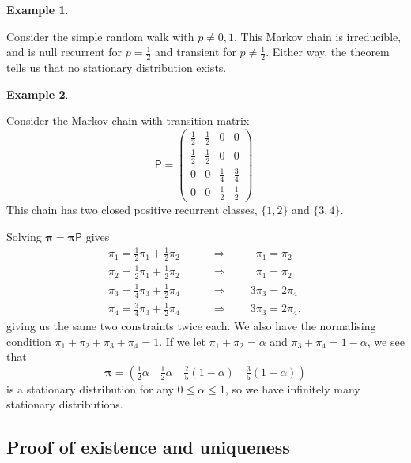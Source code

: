 \documentclass[
  a4paper,
]{article}
\theoremstyle{definition}
\theoremstyle{definition}
\newtheorem{example}{Example}[section]
\theoremstyle{definition}
\theoremstyle{remark}
\begin{document}
\begin{example}
\protect\hypertarget{exm:stat-rw}{}\label{exm:stat-rw}

Consider the simple random walk with \(p \neq 0,1\). This Markov chain is irreducible, and is null recurrent for \(p = \frac12\) and transient for \(p \neq \frac12\). Either way, the theorem tells us that no stationary distribution exists.

\end{example}

\begin{example}
\protect\hypertarget{exm:stat-two}{}\label{exm:stat-two}

Consider the Markov chain with transition matrix
\[ \mathsf P = \begin{pmatrix} \frac12 & \frac12 & 0 & 0 \\
\frac12 & \frac12 & 0 & 0 \\
0 & 0 & \frac14 & \frac34\\
0 & 0 & \frac12 & \frac12\end{pmatrix} . \]
This chain has two closed positive recurrent classes, \(\{1,2\}\) and \(\{3,4\}\).

Solving \(\boldsymbol\pi = \boldsymbol\pi\mathsf P\) gives
\begin{align*}
    \pi_1 = \tfrac12 \pi_1 + \tfrac12\pi_2 \qquad &\Rightarrow \qquad \phantom{3}\pi_1 = \pi_2 \\
    \pi_2 = \tfrac12 \pi_1 + \tfrac12\pi_2 \qquad &\Rightarrow \qquad \phantom{3}\pi_1 = \pi_2 \\
    \pi_3 = \tfrac14 \pi_3 + \tfrac12\pi_4 \qquad &\Rightarrow \qquad 3\pi_3 = 2\pi_4 \\
    \pi_4 = \tfrac34 \pi_3 + \tfrac12\pi_4 \qquad &\Rightarrow \qquad 3\pi_3 = 2\pi_4 , 
\end{align*}
giving us the same two constraints twice each. We also have the normalising condition \(\pi_1 + \pi_2+\pi_3+\pi_4 = 1\). If we let \(\pi_1 + \pi_2 = \alpha\) and \(\pi_3 + \pi_4 = 1-\alpha\), we see that
\[ \boldsymbol\pi = \left(\tfrac12\alpha\quad \tfrac12\alpha\quad \tfrac25(1-\alpha)\quad \tfrac35(1-\alpha)\right) \]
is a stationary distribution for any \(0 \leq \alpha \leq 1\), so we have infinitely many stationary distributions.

\end{example}

\hypertarget{stat-proof}{%
\subsection{Proof of existence and uniqueness}\label{stat-proof}}
\end{document}

